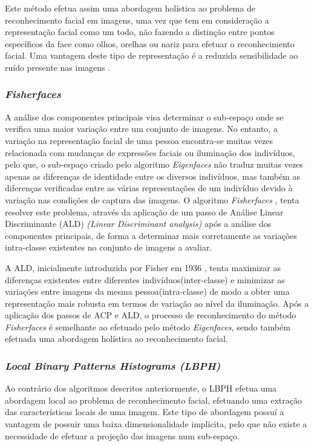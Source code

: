 Este método efetua assim uma abordagem holística ao problema de reconhecimento facial em imagens, uma vez que tem em consideração a representação facial como um todo, não fazendo a distinção entre pontos específicos da face como olhos, orelhas ou nariz para efetuar o reconhecimento facial. Uma vantagem deste tipo de representação é a reduzida sensibilidade ao ruído presente nas imagens \cite{Zhao2003}.

\subsubsection*{\textit{Fisherfaces}}
A análise dos componentes principais visa determinar o sub-espaço onde se verifica uma maior variação entre um conjunto de imagens. No entanto, a variação na representação facial de uma pessoa encontra-se muitas vezes relacionada com mudanças de expressões faciais ou iluminação dos indivíduos, pelo que, o sub-espaço criado pelo algoritmo \textit{Eigenfaces} não traduz muitas vezes apenas as diferenças de identidade entre os diversos indivíduos, mas também as diferenças verificadas entre as várias representações de um indivíduo devido à variação nas condições de captura das imagens. O algoritmo \textit{Fisherfaces} \cite{Belhumeur1997, Etemad1997, Zhao1998}, tenta resolver este problema, através da aplicação de um passo de Análise Linear Discriminante (ALD) \textit{(Linear Discriminant analysis)} após a análise dos componentes principais, de forma a determinar mais corretamente as variações intra-classe existentes no conjunto de imagens a avaliar.

A ALD, inicialmente introduzida por Fisher em 1936 \cite{FISHER1936}, tenta maximizar as diferenças existentes entre diferentes indivíduos(inter-classe) e minimizar as variações entre imagens da mesma pessoa(intra-classe) de modo a obter uma representação mais robusta em termos de variação ao nível da iluminação. Após a aplicação dos passos de ACP e ALD, o processo de reconhecimento do método \textit{Fisherfaces} é semelhante ao efetuado pelo método \textit{Eigenfaces}, sendo também efetuada uma abordagem holística ao reconhecimento facial.


\subsubsection*	{\textit{Local Binary Patterns Histograms (LBPH)}}
Ao contrário dos algoritmos descritos anteriormente, o LBPH efetua uma abordagem local ao problema de reconhecimento facial, efetuando uma extração das características locais de uma imagem. Este tipo de abordagem possuí a vantagem de possuir uma baixa dimensionalidade implícita, pelo que não existe a necessidade de efetuar a projeção das imagens num sub-espaço.

